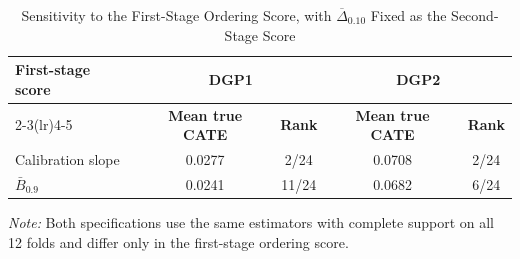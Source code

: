\begin{table}[ht]
\centering
\caption{Sensitivity to the First-Stage Ordering Score, with $\overline{\Delta}_{0.10}$ Fixed as the Second-Stage Score}
\label{tab:first_stage_score_sensitivity}
\small
\setlength{\tabcolsep}{5pt}
\begin{tabular}{@{}lcccc@{}}
\toprule
\textbf{First-stage score} & \multicolumn{2}{c}{\textbf{DGP1}} & \multicolumn{2}{c}{\textbf{DGP2}} \\
\cmidrule(lr){2-3}\cmidrule(lr){4-5}
& \textbf{Mean true CATE} & \textbf{Rank} & \textbf{Mean true CATE} & \textbf{Rank} \\
\midrule
Calibration slope & 0.0277 & 2/24 & 0.0708 & 2/24 \\
$\bar B_{0.9}$ & 0.0241 & 11/24 & 0.0682 & 6/24 \\
\bottomrule
\end{tabular}
\begin{minipage}{0.95\linewidth}
\footnotesize\textit{Note:} Both specifications use the same estimators with complete support on all 12 folds and differ only in the first-stage ordering score.
\end{minipage}
\end{table}
